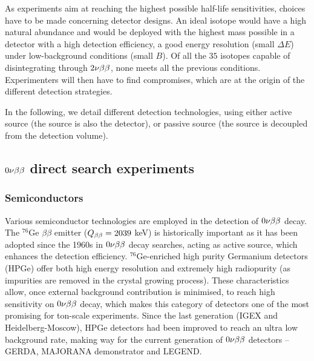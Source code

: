 As experiments aim at reaching the highest possible half-life sensitivities, choices have to be made concerning detector designs.
An ideal isotope would have a high natural abundance and would be deployed with the highest mass possible in a detector with a high detection efficiency, a good energy resolution (small $\Delta E$) under low-background conditions (small $B$).
Of all the $35$ isotopes capable of disintegrating through $2\nu\beta\beta$, none meets all the previous conditions.
Experimenters will then have to find compromises, which are at the origin of the different detection strategies.

In the following, we detail different detection technologies, using either active source (the source is also the detector), or passive source (the source is decoupled from the detection volume).


\subsection{$0\nu\beta\beta$ direct search experiments}
\label{sec:zeronuexp}
\subsubsection{Semiconductors}
\label{subsec:semiconductors}
Various semiconductor technologies are employed in the detection of $0\nu\beta\beta$ decay.
The $^{76}$Ge $\beta\beta$ emitter ($Q_{\beta\beta}=2039$ keV) is historically important as it has been adopted since the 1960s in $0\nu\beta\beta$ decay searches, acting as active source, which enhances the detection efficiency.
$^{76}$Ge-enriched high purity Germanium detectors (HPGe) offer both high energy resolution and extremely high radiopurity (as impurities are removed in the crystal growing process).
These characteristics allow, once external background contribution is minimised, to reach high sensitivity on $0\nu\beta\beta$ decay, which makes this category of detectors one of the most promising for ton-scale experiments.
Since the last generation (IGEX and Heidelberg-Moscow), HPGe detectors had been improved to reach an ultra low background rate, making way for the current generation of $0\nu\beta\beta$ detectors -- GERDA, MAJORANA demonstrator and LEGEND.

